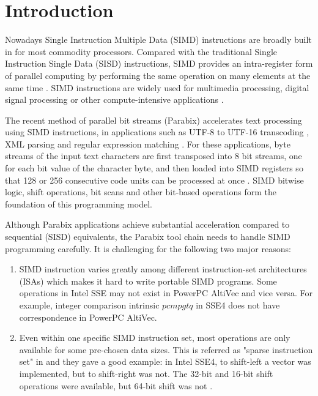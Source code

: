 %
%

\chapter{Introduction}
\label{one}

Nowadays Single Instruction Multiple Data (SIMD) instructions are broadly built in for most commodity processors. Compared with the traditional Single Instruction Single Data (SISD) instructions, SIMD provides an intra-register form of parallel computing by performing the same operation on many elements at the same time \cite{Fisher_phd}. SIMD instructions are widely used for multimedia processing, digital signal processing or other compute-intensive applications \cite{multimedia_simd, dsp_simd}.

The recent method of parallel bit streams (Parabix) accelerates text processing using SIMD instructions, in applications such as UTF-8 to UTF-16 transcoding \cite{rob_u8u16, rob_u8u16_techreport}, XML parsing \cite{medforth_icxml, rob_xml} and regular expression matching \cite{rob_regex}. For these applications, byte streams of the input text characters are first transposed into 8 bit streams, one for each bit value of the character byte, and then loaded into SIMD registers so that 128 or 256 consecutive code units can be processed at once \cite{inductive_doubling_principle}. SIMD bitwise logic, shift operations, bit scans and other bit-based operations form the foundation of this programming model.

Although Parabix applications achieve substantial acceleration compared to sequential (SISD) equivalents, the Parabix tool chain needs to handle SIMD programming carefully. It is challenging for the following two major reasons:

\begin{enumerate}
  \item SIMD instruction varies greatly among different instruction-set architectures (ISAs) which makes it hard to write portable SIMD programs. Some operations in Intel SSE may not exist in PowerPC AltiVec and vice versa. For example, integer comparison intrinsic $pcmpgtq$ in SSE4 does not have correspondence in PowerPC AltiVec.
  \item Even within one specific SIMD instruction set, most operations are only available for some pre-chosen data sizes. This is referred as "sparse instruction set" in \cite{hybrid_simd_type_legalize} and they gave a good example: in Intel SSE4, to shift-left a vector was implemented, but to shift-right was not. The 32-bit and 16-bit shift operations were available, but 64-bit shift was not \cite{hybrid_simd_type_legalize}.
\end{enumerate}

